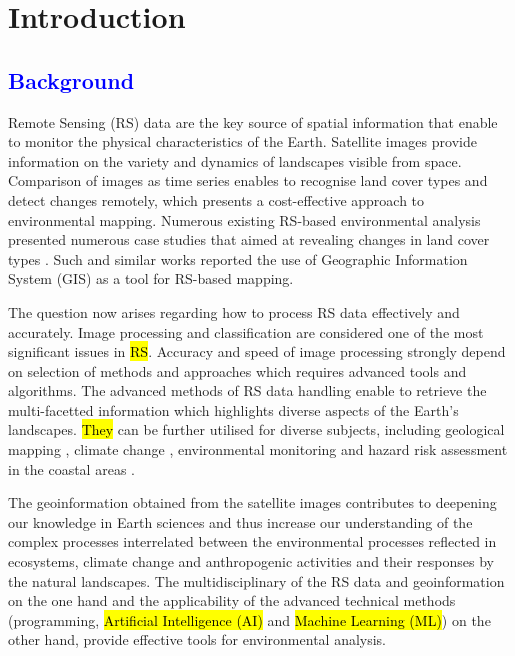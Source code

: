 \documentclass[final,5p,times,twocolumn]{elsarticle}
\numberwithin{table}{section}
\begin{document}
\section{Introduction}

\subsection{\textcolor{blue}{Background}}
Remote Sensing (RS) data are the key source of spatial information that enable to monitor the physical characteristics of the Earth. Satellite images provide information on the variety and dynamics of landscapes visible from space. Comparison of images as time series enables to recognise land cover types and detect changes remotely, which presents a cost-effective approach to environmental mapping. Numerous existing RS-based environmental analysis presented numerous case studies that aimed at revealing changes in land cover types \cite{geosciences12100357,976724,Lemenkova202211,6723424}. Such and similar works reported the use of Geographic Information System (GIS) as a tool for RS-based mapping.

The question now arises regarding how to process RS data effectively and accurately. Image processing and classification are considered one of the most significant issues in \hl{RS}. Accuracy and speed of image processing strongly depend on selection of methods and approaches which requires advanced tools and algorithms. The advanced methods of RS data handling enable to retrieve the multi-facetted information which highlights diverse aspects of the Earth's landscapes. \hl{They} can be further utilised for diverse subjects, including geological mapping \cite{AbdAlHai,Hussien}, climate change \cite{Ramat,w16081141,Seif}, environmental monitoring \cite{Govender,Lemenkova20241326} and hazard risk assessment in the coastal areas \cite{ELSHAZLY2024261,Sun,Kamh,ElRaey,LemenkovaCap,Braham}. 

The geoinformation obtained from the satellite images contributes to deepening our knowledge in Earth sciences and thus increase our understanding of the complex processes interrelated between the environmental processes reflected in ecosystems, climate change and anthropogenic activities and their responses by the natural landscapes. The multidisciplinary of the RS data and geoinformation on the one hand and the applicability of the advanced technical methods (programming, \hl{Artificial Intelligence (AI)} and \hl{Machine Learning (ML)}) on the other hand, provide effective tools for environmental analysis. 
\end{document}

